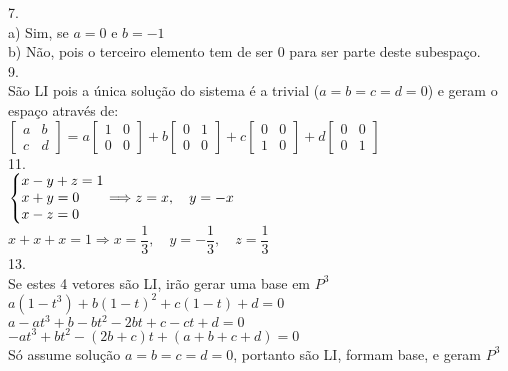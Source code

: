 \documentclass[12pt]{article}
\begin{document}
7.\\
a) Sim, se $a = 0$ e $b = -1$\\
b) Não, pois o terceiro elemento tem de ser 0 para ser parte deste subespaço.\\

9.\\
São LI pois a única solução do sistema é a trivial ($a=b=c=d=0$) e geram o espaço através de:\\
$\begin{bmatrix}a&b\\c&d\end{bmatrix} = 
a\begin{bmatrix}1&0\\0&0\end{bmatrix} + 
b\begin{bmatrix}0&1\\0&0\end{bmatrix} +
c\begin{bmatrix}0&0\\1&0\end{bmatrix} +
d\begin{bmatrix}0&0\\0&1\end{bmatrix}$\\

11.\\
$\left\{\begin{array}{@{}l@{}}
	x-y+z=1\\
	x+y=0\\
	x-z=0
\end{array}\right. \Longrightarrow z=x,\quad y = -x$\\
$x+x+x=1 \Longrightarrow x = \dfrac{1}{3},\quad y = -\dfrac{1}{3},\quad z = \dfrac{1}{3}$\\

13.\\
Se estes 4 vetores são LI, irão gerar uma base em $P^{3}$\\
$a(1-t^{3})+b(1-t)^{2}+c(1-t)+d=0$\\
$a-at^{3}+b-bt^{2}-2bt+c-ct+d=0$\\
$-at^{3}+bt^{2}-(2b+c)t+(a+b+c+d)=0$\\
Só assume solução $a=b=c=d=0$, portanto são LI, formam base, e geram $P^{3}$\\
\end{document}
